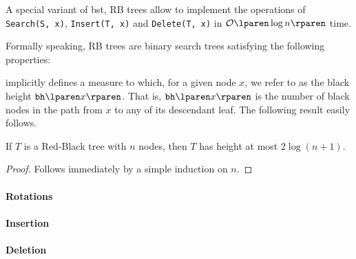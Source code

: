 \documentclass{subfiles}
\begin{document}
\label{sec:rb-trees}
    A special variant of \gls{bst}, RB trees allow to implement the operations of 
        \lstinline{Search(S, x)}, \lstinline{Insert(T, x)} and \lstinline{Delete(T, x)} in 
        \(\ofO{\log n}\) time. 

    Formally speaking, RB trees are binary search trees satisfying the following properties:

     implicitly defines a measure to which, for a given node \(x\),
        we refer to as the black height \(\bh\). That is,
        \(\bh\) is the number of black nodes in the path from \(x\) to any of its descendant leaf.
        The following result easily follows.
        \begin{lemma}
            If \(T\) is a Red-Black tree with \(n\) nodes, 
                then \(T\) has height at most \(2 \log(n + 1)\).
        \end{lemma}
        \begin{proof}
            Follows immediately by a simple induction on \(n\).
        \end{proof}

    \paragraph{Rotations}
    

    \paragraph{Insertion}
    

    \paragraph{Deletion}
    
    \clearpage
\end{document}
